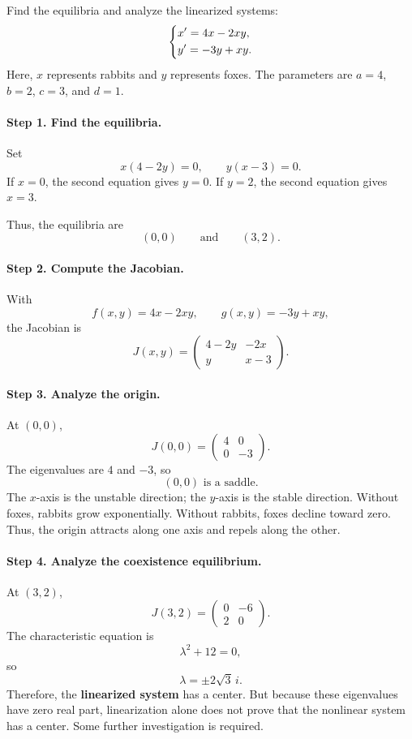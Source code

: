 \documentclass[10pt,letterpaper]{article}
\begin{document}
\begin{example}[2]{
Find the equilibria and analyze the linearized systems:
\[
\begin{dcases}
x'=4x-2xy,\\
y'=-3y+xy.
\end{dcases}
\]
Here, $x$ represents rabbits and $y$ represents foxes.
The parameters are $a=4$, $b=2$, $c=3$, and $d=1$.
}

\paragraph{Step 1. Find the equilibria.}
Set
\[
x(4-2y)=0,\qquad y(x-3)=0.
\]
If $x=0$, the second equation gives $y=0$.
If $y=2$, the second equation gives $x=3$.

Thus, the equilibria are
\[
\boxed{(0,0)\qquad\text{and}\qquad(3,2).}
\]

\paragraph{Step 2. Compute the Jacobian.}
With
\[
f(x,y)=4x-2xy,\qquad g(x,y)=-3y+xy,
\]
the Jacobian is
\[
\boxed{
J(x,y)=
\begin{pmatrix}
4-2y&-2x\\
y&x-3
\end{pmatrix}.
}
\]

\paragraph{Step 3. Analyze the origin.}
At $(0,0)$,
\[
J(0,0)=
\begin{pmatrix}
4&0\\
0&-3
\end{pmatrix}.
\]
The eigenvalues are $4$ and $-3$, so
\[
\boxed{(0,0)\text{ is a saddle}.}
\]
The $x$-axis is the unstable direction;
the $y$-axis is the stable direction. Without foxes, rabbits grow
exponentially. Without rabbits, foxes decline toward zero. Thus, the
origin attracts along one axis and repels along the other.

\paragraph{Step 4. Analyze the coexistence equilibrium.}
At $(3,2)$,
\[
J(3,2)=
\begin{pmatrix}
0&-6\\
2&0
\end{pmatrix}.
\]
The characteristic equation is
\[
\lambda^2+12=0,
\]
so
\[
\lambda=\pm2\sqrt3\,i.
\]
Therefore, the \textbf{linearized system} has a center. But because these eigenvalues have zero real part, linearization alone does not prove that the nonlinear system has a center. Some further investigation is required.

\end{example}
\end{document}
